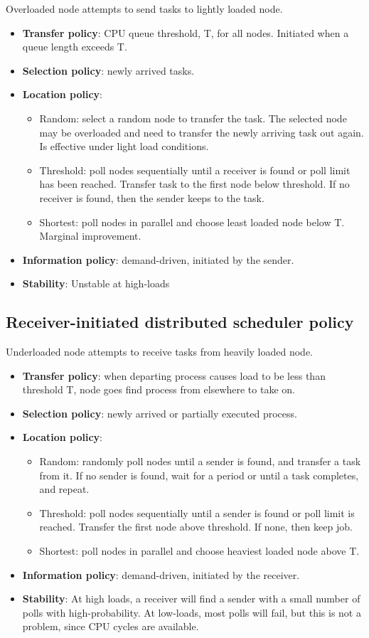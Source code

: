 \documentclass[twoside]{article}
\begin{document}
Overloaded node attempts to send tasks to lightly loaded node.
\begin{itemize}
\item {\bf Transfer policy}: CPU queue threshold, T, for all nodes. Initiated when a queue length exceeds T.
\item {\bf Selection policy}: newly arrived tasks. 
\item {\bf Location policy}:
\begin{itemize}
\item Random: select a random node to transfer the task. The selected node may be overloaded and need to transfer the newly arriving task out again. Is effective under light load conditions.
\item Threshold: poll nodes sequentially until a receiver is found or poll limit has been reached. Transfer task to the first node below threshold. If no receiver is found, then the sender keeps to the task.
\item Shortest: poll nodes in parallel and choose least loaded node below T. Marginal improvement.
\end{itemize}
\item {\bf Information policy}: demand-driven, initiated by the sender.
\item {\bf Stability}: Unstable at high-loads
\end{itemize}

\subsection{Receiver-initiated distributed scheduler policy}

Underloaded node attempts to receive tasks from heavily loaded node.
\begin{itemize}
\item {\bf Transfer policy}: when departing process causes load to be less than threshold T, node goes find process from elsewhere to take on.
\item {\bf Selection policy}:  newly arrived or partially executed process.
\item {\bf Location policy}:
\begin{itemize}
\item Random: randomly poll nodes until a sender is found, and transfer a
task from it. If no sender is found, wait for a period or until a task completes,
and repeat.
\item Threshold: poll nodes sequentially until a sender is found or poll limit is reached.
Transfer the first node above threshold. If none, then keep job.
\item Shortest: poll nodes in parallel and choose heaviest loaded node above T.
\end{itemize}
\item {\bf Information policy}: demand-driven, initiated by the receiver.
\item{\bf  Stability}: At high loads, a receiver will find a sender with a small number of polls with high-probability. At low-loads, most polls will fail, but this is
not a problem, since CPU cycles are available.
\end{itemize}
\end{document}
